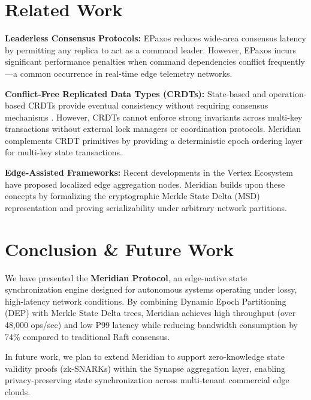 \documentclass[10pt,a4paper]{article}
\begin{document}
\section{Related Work}
\textbf{Leaderless Consensus Protocols:} EPaxos \cite{Lin2023} reduces wide-area consensus latency by permitting any replica to act as a command leader. However, EPaxos incurs significant performance penalties when command dependencies conflict frequently---a common occurrence in real-time edge telemetry networks.

\textbf{Conflict-Free Replicated Data Types (CRDTs):} State-based and operation-based CRDTs provide eventual consistency without requiring consensus mechanisms \cite{Vance2025}. However, CRDTs cannot enforce strong invariants across multi-key transactions without external lock managers or coordination protocols. Meridian complements CRDT primitives by providing a deterministic epoch ordering layer for multi-key state transactions.

\textbf{Edge-Assisted Frameworks:} Recent developments in the Vertex Ecosystem have proposed localized edge aggregation nodes. Meridian builds upon these concepts by formalizing the cryptographic Merkle State Delta (MSD) representation and proving serializability under arbitrary network partitions.

\section{Conclusion \& Future Work}
We have presented the \textbf{Meridian Protocol}, an edge-native state synchronization engine designed for autonomous systems operating under lossy, high-latency network conditions. By combining Dynamic Epoch Partitioning (DEP) with Merkle State Delta trees, Meridian achieves high throughput (over 48,000 ops/sec) and low P99 latency while reducing bandwidth consumption by 74\% compared to traditional Raft consensus.

In future work, we plan to extend Meridian to support zero-knowledge state validity proofs (zk-SNARKs) within the Synapse aggregation layer, enabling privacy-preserving state synchronization across multi-tenant commercial edge clouds.

\end{document}
